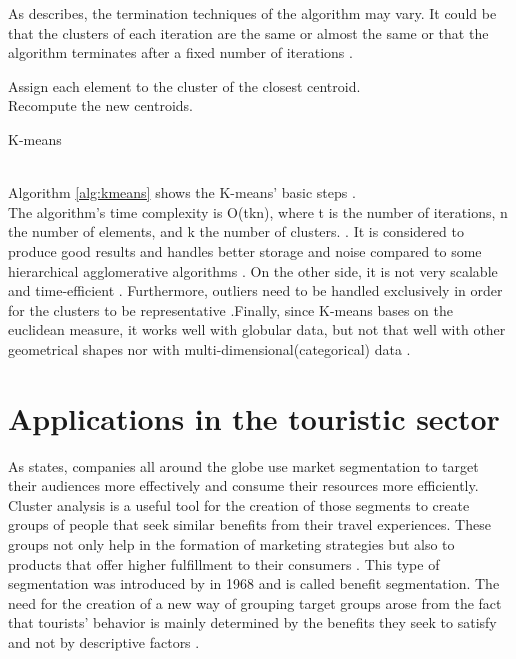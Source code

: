 As \textcite{dunham} describes, the termination techniques of the algorithm may vary. It could be that the clusters of each iteration are the same or almost the same or that the algorithm terminates after a fixed number of iterations \autocite[140]{dunham}.  
\begin{algorithm}
\SetAlgoLined
{}
{
Assign each element to the cluster of the closest centroid.\\
Recompute the new centroids.
}
\caption{K-means}\label{alg:kmeans}
\end{algorithm} \\
Algorithm \ref{alg:kmeans} shows the K-means' basic steps \autocite{dunham, tanSteinKum}. \\
The algorithm's time complexity is O(tkn), where t is the number of iterations, n the number of elements, and k the number of clusters. \autocite[141]{dunham}. It is considered to produce good results and handles better storage and noise compared to some hierarchical agglomerative algorithms \autocite[526]{tanSteinKum}. On the other side, it is not very scalable and time-efficient \autocite[141]{dunham}. Furthermore, outliers need to be handled exclusively in order for the clusters to be representative \autocite[506]{tanSteinKum}.Finally, since K-means bases on the euclidean measure, it works well with globular data, but not that well with other geometrical shapes nor with multi-dimensional(categorical) data \autocite[647, 649]{survey}. 
\section{Applications in the touristic sector}
\label{applications}
As \textcite{data-drivenSegmentation} states, companies all around the globe use market segmentation to target their audiences more effectively and consume their resources more efficiently. Cluster analysis is a useful tool for the creation of those segments to create groups of people that seek similar benefits from their travel experiences. These groups not only help in the formation of marketing strategies but also to products that offer higher fulfillment to their consumers \autocite[17]{data-drivenSegmentation}. This type of segmentation was introduced by \textcite{Haley} in 1968 and is called benefit segmentation. The need for the creation of a new way of grouping target groups arose from the fact that tourists' behavior is mainly determined by the benefits they seek to satisfy and not by descriptive factors \autocite[31]{Haley}. \\

